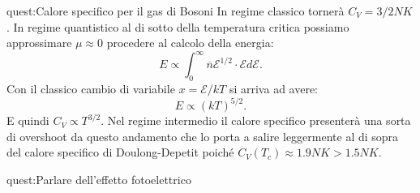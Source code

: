\begin{quest}{quest:Calore specifico per il gas di Bosoni}
    In regime classico tornerà $C_V = 3 /2 NK$. In regime quantistico al di sotto della temperatura critica possiamo approssimare $\mu\approx  0$ procedere al calcolo della energia:
\[
    E \propto  \int_0^{\infty} \overline{n}\mathcal{E}^{1 /2}\cdot \mathcal{E}  d\mathcal{E}
.\] 
Con il classico cambio di variabile $x = \mathcal{E}  /kT$ si arriva ad avere:
\[
    E \propto  \left(kT\right)^{5 /2}
.\] 
E quindi $C_V \propto T^{3 /2}$. Nel regime intermedio il calore specifico presenterà una sorta di overshoot da questo andamento che lo porta a salire leggermente al di sopra del calore specifico di Doulong-Depetit poiché $C_V(T_c) \approx 1.9 NK > 1.5 NK$.
\end{quest}
\begin{quest}{quest:Parlare dell'effetto fotoelettrico}

\end{quest}

